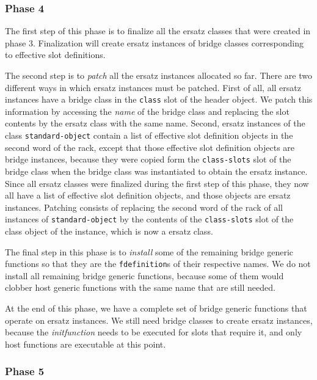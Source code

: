 \subsubsection{Phase 4}

The first step of this phase is to finalize all the ersatz classes
that were created in phase 3.  Finalization will create ersatz
instances of bridge classes corresponding to effective slot
definitions. 

The second step is to \emph{patch} all the ersatz instances allocated
so far.  There are two different ways in which ersatz instances must
be patched.  First of all, all ersatz instances have a bridge class in
the \texttt{class} slot of the header object.  We patch this
information by accessing the \emph{name} of the bridge class and
replacing the slot contents by the ersatz class with the same name.
Second, ersatz instances of the class \texttt{standard-object} contain
a list of effective slot definition objects in the second word of the
rack, except that those effective slot definition objects
are bridge instances, because they were copied form the
\texttt{class-slots} slot of the bridge class when the bridge class
was instantiated to obtain the ersatz instance.  Since all ersatz
classes were finalized during the first step of this phase, they now
all have a list of effective slot definition objects, and those
objects are ersatz instances.  Patching consists of replacing the
second word of the rack of all instances of
\texttt{standard-object} by the contents of the \texttt{class-slots}
slot of the class object of the instance, which is now a ersatz
class. 

The final step in this phase is to \emph{install} some of the
remaining bridge generic functions so that they are the
\texttt{fdefinition}s of their respective names.  We do not install
all remaining bridge generic functions, because some of them would
clobber host generic functions with the same name that are still
needed.  

At the end of this phase, we have a complete set of bridge generic
functions that operate on ersatz instances.  We still need bridge
classes to create ersatz instances, because the \emph{initfunction}
needs to be executed for slots that require it, and only host
functions are executable at this point.

\subsubsection{Phase 5}

